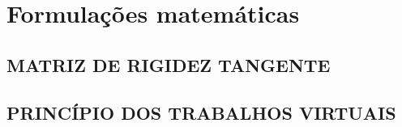 \chapter{Formulações matemáticas}\label{Sec:formulacoesmatematicas}
\section{MATRIZ DE RIGIDEZ TANGENTE} \label{Sec:matrizrigideztangente}

\section{PRINCÍPIO DOS TRABALHOS VIRTUAIS}\label{Sec:PTV}
